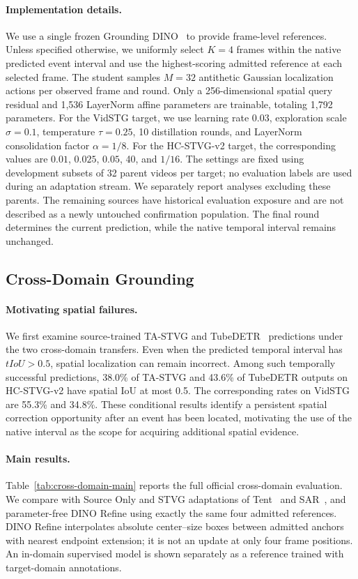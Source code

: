 \documentclass[10pt,twocolumn,letterpaper]{article}
\begin{document}
\paragraph{Implementation details.}
We use a single frozen Grounding DINO~\cite{groundingdino}
to provide frame-level references. Unless specified otherwise,
we uniformly select $K=4$ frames within the native predicted
event interval and use the highest-scoring admitted reference
at each selected frame. The student samples $M=32$ antithetic
Gaussian localization actions per observed frame and round.
Only a 256-dimensional spatial query residual and 1,536
LayerNorm affine parameters are trainable, totaling 1,792
parameters. For the VidSTG target, we use learning rate
$0.03$, exploration scale $\sigma=0.1$, temperature $\tau=0.25$,
10 distillation rounds, and LayerNorm consolidation factor
$\alpha=1/8$. For the HC-STVG-v2 target, the corresponding
values are $0.01$, $0.025$, $0.05$, 40, and $1/16$.
The settings are fixed using development subsets of 32 parent
videos per target; no evaluation labels are used during an
adaptation stream. We separately report analyses excluding these
parents. The remaining sources have historical evaluation exposure
and are not described as a newly untouched confirmation population. The final round determines the current
prediction, while the native temporal interval remains unchanged.

\subsection{Cross-Domain Grounding}
\label{sec:cross-domain-results}

\paragraph{Motivating spatial failures.}
We first examine source-trained TA-STVG and
TubeDETR~\cite{tubedetr} predictions under the two cross-domain
transfers. Even when the predicted temporal interval has
$tIoU>0.5$, spatial localization can remain incorrect.
Among such temporally successful predictions, 38.0\% of
TA-STVG and 43.6\% of TubeDETR outputs on HC-STVG-v2 have
spatial IoU at most 0.5. The corresponding rates on VidSTG
are 55.3\% and 34.8\%. These conditional results identify a
persistent spatial correction opportunity after an event has
been located, motivating the use of the native interval as
the scope for acquiring additional spatial evidence.

\paragraph{Main results.}
Table~\ref{tab:cross-domain-main} reports the full official
cross-domain evaluation. We compare with Source Only and
STVG adaptations of Tent~\cite{tent} and SAR~\cite{sar},
and parameter-free DINO Refine using exactly the same four
admitted references. DINO Refine interpolates absolute center--size
boxes between admitted anchors with nearest endpoint extension;
it is not an update at only four frame positions.
An in-domain supervised model is shown separately as a
reference trained with target-domain annotations.
\end{document}
